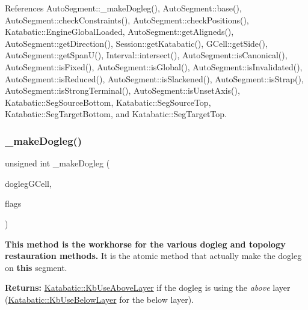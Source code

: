 References Auto\+Segment\+::\+\_\+make\+Dogleg(), Auto\+Segment\+::base(), Auto\+Segment\+::check\+Constraints(), Auto\+Segment\+::check\+Positions(), Katabatic\+::\+Engine\+Global\+Loaded, Auto\+Segment\+::get\+Aligneds(), Auto\+Segment\+::get\+Direction(), Session\+::get\+Katabatic(), G\+Cell\+::get\+Side(), Auto\+Segment\+::get\+Span\+U(), Interval\+::intersect(), Auto\+Segment\+::is\+Canonical(), Auto\+Segment\+::is\+Fixed(), Auto\+Segment\+::is\+Global(), Auto\+Segment\+::is\+Invalidated(), Auto\+Segment\+::is\+Reduced(), Auto\+Segment\+::is\+Slackened(), Auto\+Segment\+::is\+Strap(), Auto\+Segment\+::is\+Strong\+Terminal(), Auto\+Segment\+::is\+Unset\+Axis(), Katabatic\+::\+Seg\+Source\+Bottom, Katabatic\+::\+Seg\+Source\+Top, Katabatic\+::\+Seg\+Target\+Bottom, and Katabatic\+::\+Seg\+Target\+Top.

\mbox{\label{classKatabatic_1_1AutoSegment_a37a14b40295ccb50cd5001891385807b}} 
\subsubsection{\texorpdfstring{\+\_\+make\+Dogleg()}{\_makeDogleg()}}
{\footnotesize\ttfamily unsigned int \+\_\+make\+Dogleg (\begin{DoxyParamCaption}\item[{\hyperlink{classKatabatic_1_1GCell}{G\+Cell} $\ast$}]{dogleg\+G\+Cell,  }\item[{unsigned int}]{flags }\end{DoxyParamCaption})\hspace{0.3cm}{\ttfamily [pure virtual]}}

{\bfseries This method is the workhorse for the various dogleg and topology restauration methods.} It is the atomic method that actually make the dogleg on {\bfseries this} segment.

{\bfseries Returns\+:} \hyperlink{namespaceKatabatic_a2af2ad6b6441614038caf59d04b3b217af756099f1bbe259dd1bf22067dc40eac}{Katabatic\+::\+Kb\+Use\+Above\+Layer} if the dogleg is using the {\itshape above} layer (\hyperlink{namespaceKatabatic_a2af2ad6b6441614038caf59d04b3b217a41cbd981337678e042354f340bfae25d}{Katabatic\+::\+Kb\+Use\+Below\+Layer} for the below layer).

